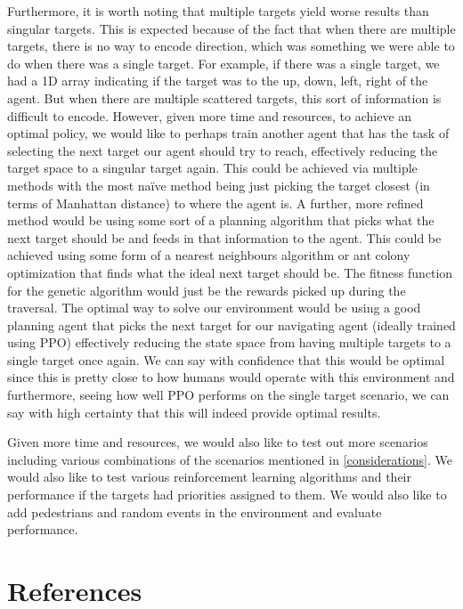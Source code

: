 \documentclass{article}
\begin{document}
Furthermore, it is worth noting that multiple targets yield worse results than singular targets. This is expected because of the fact that when there are multiple targets, there is no way to encode direction, which was something we were able to do when there was a single target. For example, if there was a single target, we had a 1D array indicating if the target was to the up, down, left, right of the agent. But when there are multiple scattered targets, this sort of information is difficult to encode. However, given more time and resources, to achieve an optimal policy, we would like to perhaps train another agent that has the task of selecting the next target our agent should try to reach, effectively reducing the target space to a singular target again. This could be achieved via multiple methods with the most na\"ive method being just picking the target closest (in terms of Manhattan distance) to where the agent is. A further, more refined method would be using some sort of a planning algorithm that picks what the next target should be and feeds in that information to the agent. This could be achieved using some form of a nearest neighbours algorithm or ant colony optimization that finds what the ideal next target should be. The fitness function for the genetic algorithm would just be the rewards picked up during the traversal. The optimal way to solve our environment would be using a good planning agent that picks the next target for our navigating agent (ideally trained using PPO) effectively reducing the state space from having multiple targets to a single target once again. We can say with confidence that this would be optimal since this is pretty close to how humans would operate with this environment and furthermore, seeing how well PPO performs on the single target scenario, we can say with high certainty that this will indeed provide optimal results.

Given more time and resources, we would also like to test out more scenarios including various combinations of the scenarios mentioned in \ref{considerations}. We would also like to test various reinforcement learning algorithms and their performance if the targets had priorities assigned to them. We would also like to add pedestrians and random events in the environment and evaluate performance.

\section*{References}
\end{document}
